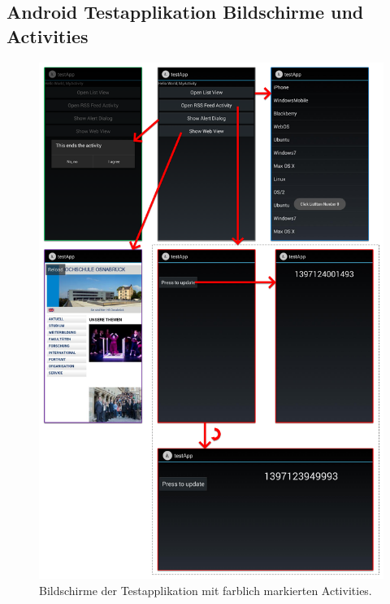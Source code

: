 \subsection{Android Testapplikation Bildschirme und Activities \label{anhang:test_app_screens}}
\begin{figure}[htb]
	\centering
	\includegraphics[width=0.75\linewidth]{img/client_test_app_screens}
	\caption{Bildschirme der Testapplikation mit farblich markierten Activities. \label{bild:client_test_app_screens}}
\end{figure}
